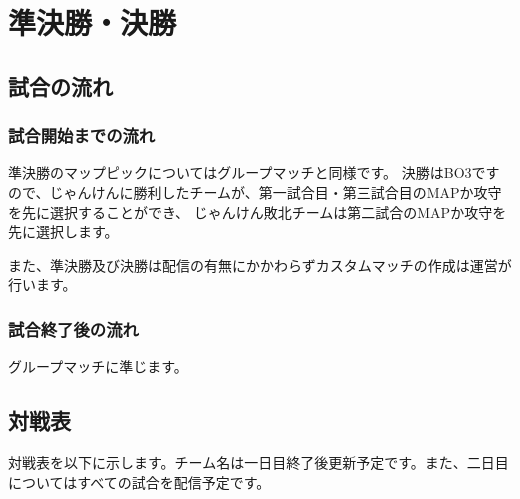 \documentclass[uplatex,dvipdfmx]{jsarticle}
\begin{document}
\section{準決勝・決勝}
	\subsection{試合の流れ}
	    \subsubsection{試合開始までの流れ}
	        準決勝のマップピックについてはグループマッチと同様です。
	        決勝はBO3ですので、じゃんけんに勝利したチームが、第一試合目・第三試合目のMAPか攻守を先に選択することができ、
	        じゃんけん敗北チームは第二試合のMAPか攻守を先に選択します。

	        また、準決勝及び決勝は配信の有無にかかわらずカスタムマッチの作成は運営が行います。

	    \subsubsection{試合終了後の流れ}
	        グループマッチに準じます。
		
	\subsection{対戦表}
	    対戦表を以下に示します。チーム名は一日目終了後更新予定です。また、二日目についてはすべての試合を配信予定です。
	    
\end{document}

